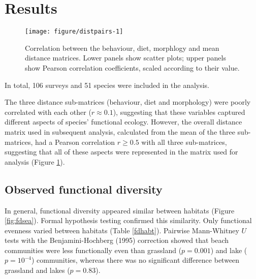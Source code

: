 \documentclass[12pt,a4paper]{article}\usepackage[]{graphicx}\usepackage[]{color}
\author{Josh Nightingale}
\newenvironment{knitrout}{}{} %
\begin{document}
\section*{Results}







\begin{knitrout}
\color{fgcolor}\begin{figure}[t]

{\centering \texttt{[image: figure/distpairs-1]} 

}

\caption[Correlation between the behaviour, diet, morphlogy and mean distance matrices]{Correlation between the behaviour, diet, morphlogy and mean distance matrices. Lower panels show scatter plots; upper panels show Pearson correlation coefficients, scaled according to their value.}\label{fig:distpairs}
\end{figure}


\end{knitrout}

In total, 106 surveys and 51 species were included in the analysis. 

The three distance sub-matrices (behaviour, diet and morphology) were poorly correlated with each other ($r \approx 0.1$), suggesting that these variables captured different aspects of species' functional ecology. 
However, the overall distance matrix used in subsequent analysis, calculated from the mean of the three sub-matrices, had a Pearson correlation $r \geq 0.5$ with all three sub-matrices, suggesting that all of these aspects were represented in the matrix used for analysis (Figure \ref{fig:distpairs}).

\clearpage
\subsection{Observed functional diversity}





In general, functional diversity appeared similar between habitats (Figure \ref{fig:fdsea}). Formal hypothesis testing confirmed this similarity. Only functional evenness varied between habitats (Table \ref{fdhabt}). Pairwise Mann-Whitney $U$ tests with the Benjamini-Hochberg (1995) correction showed that beach communities were less functionally even than grassland ($p = 0.001$) and lake ($p = \ensuremath{10^{-4}}$) communities, whereas there was no significant difference between grassland and lakes ($p = 0.83$).
\end{document}
